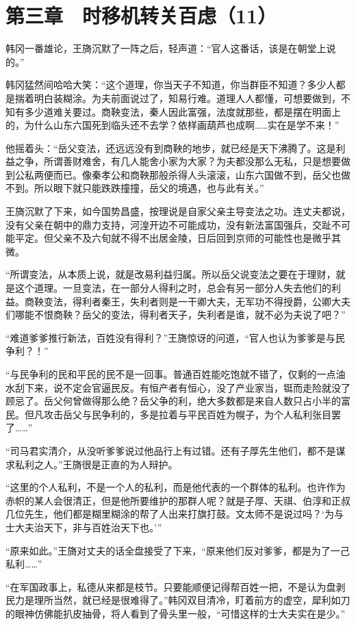 \section{第三章　时移机转关百虑（11）}

韩冈一番雄论，王旖沉默了一阵之后，轻声道：“官人这番话，该是在朝堂上说的。”

韩冈猛然间哈哈大笑：“这个道理，你当天子不知道，你当群臣不知道？多少人都是揣着明白装糊涂。为夫前面说过了，知易行难。道理人人都懂，可想要做到，不知有多少道难关要过。商鞅变法，秦人因此富强，法度就那些，都是摆在明面上的，为什么山东六国死到临头还不去学？依样画葫芦也成啊……实在是学不来！”

他摇着头：“岳父变法，还远远没有到商鞅的地步，就已经是天下沸腾了。这是利益之争，所谓善财难舍，有几人能舍小家为大家？为夫都没那么无私，只是想要做到公私两便而已。像秦孝公和商鞅那般杀得人头滚滚，山东六国做不到，岳父也做不到。所以眼下就只能跌跌撞撞，岳父的境遇，也与此有关。”

王旖沉默了下来，如今国势昌盛，按理说是自家父亲主导变法之功。连丈夫都说，没有父亲在朝中的鼎力支持，河湟开边不可能成功，没有新法富国强兵，交趾不可能平定。但父亲不及六旬就不得不出居金陵，日后回到京师的可能性也是微乎其微。

“所谓变法，从本质上说，就是改易利益归属。所以岳父说变法之要在于理财，就是这个道理。一旦变法，在一部分人得利之时，总会有另一部分人失去他们的利益。商鞅变法，得利者秦王，失利者则是一干卿大夫，无军功不得授爵，公卿大夫们哪能不恨商鞅？岳父的变法，得利者天子，失利者是谁，就不必为夫说了吧？”

“难道爹爹推行新法，百姓没有得利？”王旖惊讶的问道，“官人也认为爹爹是与民争利？！”

“与民争利的民和平民的民不是一回事。普通百姓能吃饱就不错了，仅剩的一点油水刮下来，说不定会官逼民反。有恒产者有恒心，没了产业家当，铤而走险就没了顾忌了。岳父何曾做得那么绝？岳父争的利，绝大多数都是来自人数只占小半的富民。但凡攻击岳父与民争利的，多是拉着与平民百姓为幌子，为个人私利张目罢了……”

“司马君实清介，从没听爹爹说过他品行上有过错。还有子厚先生他们，都不是谋求私利之人。”王旖很是正直的为人辩护。

“这里的个人私利，不是一个人的私利，而是他代表的一个群体的私利。也许作为赤帜的某人会很清正，但是他所要维护的那群人呢？就是子厚、天祺、伯淳和正叔几位先生，他们都是糊里糊涂的帮了人出来打旗打鼓。文太师不是说过吗？‘为与士大夫治天下，非与百姓治天下也。’”

“原来如此。”王旖对丈夫的话全盘接受了下来，“原来他们反对爹爹，都是为了一己私利……”

“在军国政事上，私德从来都是枝节。只要能顺便记得帮百姓一把，不是认为盘剥民力是理所当然，就已经是很难得了。”韩冈双目清冷，盯着前方的虚空，犀利如刀的眼神仿佛能扒皮抽骨，将人看到了骨头里一般，“可惜这样的士大夫实在是少。”

